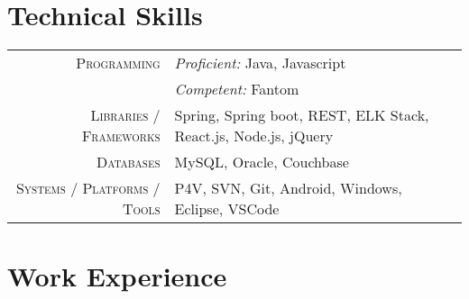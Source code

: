 \documentclass[a4paper,10pt]{extarticle} %
\begin{document}

\section{\textcolor{primary}{Technical Skills}}

\begin{tabular}{r|p{15cm}}

\textsc{Programming} & \textit{Proficient:} Java, Javascript\\
& \textit{Competent:} Fantom \\
\textsc{Libraries / Frameworks} & Spring, Spring boot, REST, ELK Stack, React.js, Node.js, jQuery \\
\textsc{Databases} & MySQL, Oracle, Couchbase\\
\textsc{Systems / Platforms / Tools} & P4V, SVN, Git, Android, Windows, Eclipse, VSCode\\

\end{tabular}





\section{\textcolor{primary}{Work Experience}}
\end{document}
